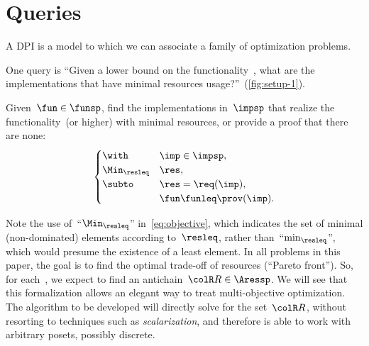 \section{Queries}
\label{sec:design-problems-querying}

A DPI is a model to which we can associate a family of optimization problems.


One query is
``Given a lower bound on the functionality~\fun, what
are the implementations that have minimal resources usage?''~(\cref{fig:setup-1}).

\begin{problem}[\FixFunMinReq]
    \label{prob:problem1}Given~$\fun\in\funsp$, find the implementations
    in~$\impsp$ that realize the functionality~\fun (or higher)
    with minimal resources, or provide a proof that there are none:
    \begin{equation}
        \begin{cases}
            \with & \imp\in\impsp,\\
            \Min_{\resleq} & \res,\\
            \subto & \res=\req(\imp),\\
            & \fun\funleq\prov(\imp).
        \end{cases}\label{eq:objective}
    \end{equation}
\end{problem}


\begin{remark}
    Note the use of~``$\Min_{\resleq}$'' in~\cref{eq:objective},
    which indicates the set of minimal (non-dominated) elements according
    to~$\resleq$, rather than~``$\min_{\resleq}$'', which would
    presume the existence of a least element. In all problems in this
    paper, the goal is to find the optimal trade-off of resources (``Pareto
    front''). So, for each~\fun, we expect to find an antichain~${\colR R}\in\Aressp$.
    We will see that this formalization allows an elegant way to treat
    multi-objective optimization. The algorithm to be developed will directly
    solve for the set~${\colR R}$, without resorting to techniques such
    as \emph{scalarization}, and therefore is able to work with arbitrary
    posets, possibly discrete.
\end{remark}


